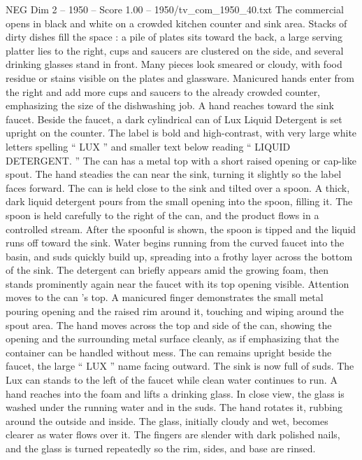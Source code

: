 \begin{textsample}{NEG Dim 2 – 1950 – Score 1.00 – 1950/tv\_com\_1950\_40.txt}  \label{ex:f2_neg_012}
The commercial opens in black and white on a crowded kitchen counter and sink area.
Stacks of dirty dishes fill the space : a pile of plates sits toward the back, a large serving platter lies to the right, cups and saucers are clustered on the side, and several drinking glasses stand in front.
Many pieces look smeared or cloudy, with food residue or stains visible on the plates and glassware.
Manicured hands enter from the right and add more cups and saucers to the already crowded counter, emphasizing the size of the dishwashing job.
A hand reaches toward the sink faucet.
Beside the faucet, a dark cylindrical can of Lux Liquid Detergent is set upright on the counter.
The label is bold and high-contrast, with very large white letters spelling “ LUX ” and smaller text below reading “ LIQUID DETERGENT. ” The can has a metal top with a short raised opening or cap-like spout.
The hand steadies the can near the sink, turning it slightly so the label faces forward.
The can is held close to the sink and tilted over a spoon.
A thick, dark liquid detergent pours from the small opening into the spoon, filling it.
The spoon is held carefully to the right of the can, and the product flows in a controlled stream.
After the spoonful is shown, the spoon is tipped and the liquid runs off toward the sink.
Water begins running from the curved faucet into the basin, and suds quickly build up, spreading into a frothy layer across the bottom of the sink.
The detergent can briefly appears amid the growing foam, then stands prominently again near the faucet with its top opening visible.
Attention moves to the can ’s top.
A manicured finger demonstrates the small metal pouring opening and the raised rim around it, touching and wiping around the spout area.
The hand moves across the top and side of the can, showing the opening and the surrounding metal surface cleanly, as if emphasizing that the container can be handled without mess.
The can remains upright beside the faucet, the large “ LUX ” name facing outward.
The sink is now full of suds.
The Lux can stands to the left of the faucet while clean water continues to run.
A hand reaches into the foam and lifts a drinking glass.
In close view, the glass is washed under the running water and in the suds.
The hand rotates it, rubbing around the outside and inside.
The glass, initially cloudy and wet, becomes clearer as water flows over it.
The fingers are slender with dark polished nails, and the glass is turned repeatedly so the rim, sides, and base are rinsed.

\end{textsample}
